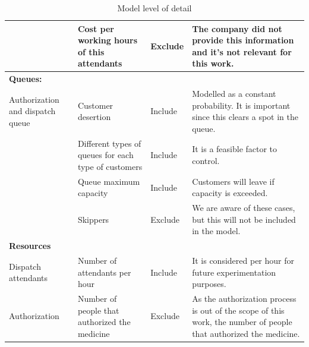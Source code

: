 \begin{table}[H]
\begin{tabular}{p{2cm}p{3cm}lp{6cm}}
                                 & Cost per working hours of this attendants                    & Exclude                  & The company did not provide this information and it's not relevant for this work.                                                                                         \\ \hline
\textbf{Queues:}                 &                                                              &                          &                                                                                                                                                                           \\
Authorization and dispatch queue & Customer desertion                                           & Include                  & Modelled as a constant probability. It is important since this clears a spot in the queue.                                                                                \\
                                 & Different types of queues for each type of customers         & Include                  & It is a feasible factor to control.                                                                                                                                       \\
                                 & Queue maximum capacity                                       & Include                  & Customers will leave if capacity is exceeded.                                                                                                                             \\
                                 & Skippers                                                     & Exclude                  & We are aware of these cases, but this will not be included in the model.                                                        \\ \hline
\textbf{Resources}               &                                                              &                          &                                                                                                                                                                           \\
Dispatch attendants              & Number of attendants per hour                                & Include                  & It is considered per hour for future experimentation purposes.                                                                                                            \\
Authorization                    & Number of people that authorized the medicine                & Exclude                  & As the authorization process is out of the scope of this work, the number of people that authorized the medicine.                                                         \\ \hline
\end{tabular}
\caption{Model level of detail}
\label{tab:datail_level}
\end{table}

